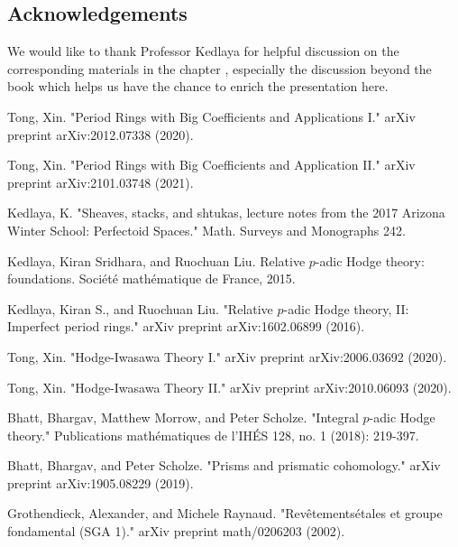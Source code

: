 \documentclass[12pt]{amsart}
\theoremstyle{definition}
\numberwithin{equation}{section}
\begin{document}
\newpage

\subsection*{Acknowledgements} 
We would like to thank Professor Kedlaya for helpful discussion on the corresponding materials in the chapter \cite{Ked1}, especially the discussion beyond the book which helps us have the chance to enrich the presentation here.













\begin{thebibliography}{10}
 Tong, Xin. "Period Rings with Big Coefficients and Applications I." arXiv preprint arXiv:2012.07338 (2020).

 Tong, Xin. "Period Rings with Big Coefficients and Application II." arXiv preprint arXiv:2101.03748 (2021).

 Kedlaya, K. "Sheaves, stacks, and shtukas, lecture notes from the 2017 Arizona Winter School: Perfectoid Spaces." Math. Surveys and Monographs 242.

 Kedlaya, Kiran Sridhara, and Ruochuan Liu. Relative $p$-adic Hodge theory: foundations. Soci\'et\'e math\'ematique de France, 2015.

 Kedlaya, Kiran S., and Ruochuan Liu. "Relative $p$-adic Hodge theory, II: Imperfect period rings." arXiv preprint arXiv:1602.06899 (2016).


 Tong, Xin. "Hodge-Iwasawa Theory I." arXiv preprint arXiv:2006.03692 (2020).

 Tong, Xin. "Hodge-Iwasawa Theory II." arXiv preprint arXiv:2010.06093 (2020).


 Bhatt, Bhargav, Matthew Morrow, and Peter Scholze. "Integral $ p $-adic Hodge theory." Publications math\'ematiques de l'IH\'ES 128, no. 1 (2018): 219-397.

 Bhatt, Bhargav, and Peter Scholze. "Prisms and prismatic cohomology." arXiv preprint arXiv:1905.08229 (2019).


 
 Grothendieck, Alexander, and Michele Raynaud. "Rev\^ etements\'etales et groupe fondamental (SGA 1)." arXiv preprint math/0206203 (2002). 



\end{thebibliography}
\end{document}
